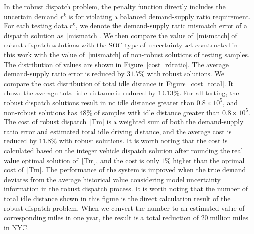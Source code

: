 \documentclass[10pt,twocolumn,twoside,english]{IEEEtran}
\begin{document}
In the robust dispatch problem, the penalty function directly includes the uncertain demand $r^k$ is  for violating a balanced demand-supply ratio requirement. For each testing data $r^k$, we denote the demand-supply ratio mismatch error of a dispatch solution as~\eqref{mismatch}. We then compare the value of~\eqref{mismatch} of robust dispatch solutions with the SOC type of uncertainty set constructed in this work with the value of~\eqref{mismatch} of non-robust solutions of testing samples. The distribution of values are shown in Figure~\ref{cost_rdratio}. The average demand-supply ratio error is reduced by $31.7\%$ with robust solutions. We compare the cost distribution of total idle distance in Figure~\ref{cost_total}. It shows the average total idle distance is reduced by $10.13\%$. For all testing, the robust dispatch solutions result in no idle distance greater than $0.8 \times 10^5$, and non-robust solutions has $48\%$ of samples with idle distance greater than $0.8 \times 10^5$.  The cost of robust dispatch~\eqref{Tm} is a weighted sum of both the demand-supply ratio error and estimated total idle driving distance, and the average cost is reduced by $11.8\%$ with robust solutions. It is worth noting that the cost is calculated based on the integer vehicle dispatch solution after rounding the real value optimal solution of~\eqref{Tm}, and the cost is only $1\%$ higher than the optimal cost of~\eqref{Tm}. The performance of the system is improved when the true demand deviates from the average historical value considering model uncertainty information in the robust dispatch process. It is worth noting that the number of total idle distance shown in this figure is the direct calculation result of the robust dispatch problem. When we convert the number to an estimated value of corresponding miles in one year, the result is a total reduction of $20$ million miles in NYC.
\end{document}
